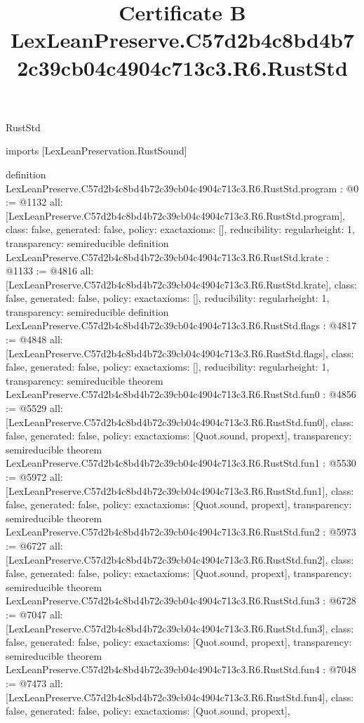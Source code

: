 \begin{lexlean}{RustStd}
\title{Certificate B LexLeanPreserve.C57d2b4c8bd4b72c39cb04c4904c713c3.R6.RustStd}
\begin{coremodule}
imports [LexLeanPreservation.RustSound]

definition LexLeanPreserve.C57d2b4c8bd4b72c39cb04c4904c713c3.R6.RustStd.program : @0 := @1132 {
  all: [LexLeanPreserve.C57d2b4c8bd4b72c39cb04c4904c713c3.R6.RustStd.program],
  class: false,
  generated: false,
  policy: exact{axioms: []},
  reducibility: regular{height: 1},
  transparency: semireducible
}
definition LexLeanPreserve.C57d2b4c8bd4b72c39cb04c4904c713c3.R6.RustStd.krate : @1133 := @4816 {
  all: [LexLeanPreserve.C57d2b4c8bd4b72c39cb04c4904c713c3.R6.RustStd.krate],
  class: false,
  generated: false,
  policy: exact{axioms: []},
  reducibility: regular{height: 1},
  transparency: semireducible
}
definition LexLeanPreserve.C57d2b4c8bd4b72c39cb04c4904c713c3.R6.RustStd.flags : @4817 := @4848 {
  all: [LexLeanPreserve.C57d2b4c8bd4b72c39cb04c4904c713c3.R6.RustStd.flags],
  class: false,
  generated: false,
  policy: exact{axioms: []},
  reducibility: regular{height: 1},
  transparency: semireducible
}
theorem LexLeanPreserve.C57d2b4c8bd4b72c39cb04c4904c713c3.R6.RustStd.fun0 : @4856 := @5529 {
  all: [LexLeanPreserve.C57d2b4c8bd4b72c39cb04c4904c713c3.R6.RustStd.fun0],
  class: false,
  generated: false,
  policy: exact{axioms: [Quot.sound, propext]},
  transparency: semireducible
}
theorem LexLeanPreserve.C57d2b4c8bd4b72c39cb04c4904c713c3.R6.RustStd.fun1 : @5530 := @5972 {
  all: [LexLeanPreserve.C57d2b4c8bd4b72c39cb04c4904c713c3.R6.RustStd.fun1],
  class: false,
  generated: false,
  policy: exact{axioms: [Quot.sound, propext]},
  transparency: semireducible
}
theorem LexLeanPreserve.C57d2b4c8bd4b72c39cb04c4904c713c3.R6.RustStd.fun2 : @5973 := @6727 {
  all: [LexLeanPreserve.C57d2b4c8bd4b72c39cb04c4904c713c3.R6.RustStd.fun2],
  class: false,
  generated: false,
  policy: exact{axioms: [Quot.sound, propext]},
  transparency: semireducible
}
theorem LexLeanPreserve.C57d2b4c8bd4b72c39cb04c4904c713c3.R6.RustStd.fun3 : @6728 := @7047 {
  all: [LexLeanPreserve.C57d2b4c8bd4b72c39cb04c4904c713c3.R6.RustStd.fun3],
  class: false,
  generated: false,
  policy: exact{axioms: [Quot.sound, propext]},
  transparency: semireducible
}
theorem LexLeanPreserve.C57d2b4c8bd4b72c39cb04c4904c713c3.R6.RustStd.fun4 : @7048 := @7473 {
  all: [LexLeanPreserve.C57d2b4c8bd4b72c39cb04c4904c713c3.R6.RustStd.fun4],
  class: false,
  generated: false,
  policy: exact{axioms: [Quot.sound, propext]},
}
\end{coremodule}
\end{lexlean}
